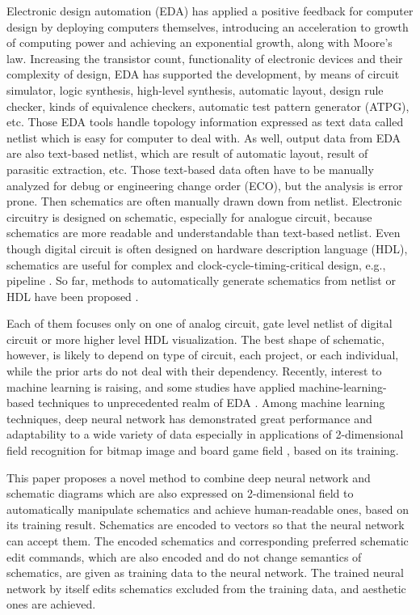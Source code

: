 \documentclass[twocolumn]{article}
\begin{document}
Electronic design automation (EDA) has applied a positive feedback
for computer design by deploying computers themselves,
introducing an acceleration to growth of computing power
and achieving an exponential growth, along with Moore's law.
Increasing the transistor count,
functionality of electronic devices and their complexity of design,
EDA has supported the development, by means of circuit simulator,
logic synthesis, high-level synthesis, automatic layout,
design rule checker, kinds of equivalence checkers,
automatic test pattern generator (ATPG), etc.
Those EDA tools handle topology information expressed as text data
called netlist which is easy for computer to deal with.
As well, output data from EDA are also text-based netlist,
which are result of automatic layout, result of parasitic extraction, etc.
Those text-based data often have to be manually analyzed
for debug or engineering change order (ECO),
but the analysis is error prone.
Then schematics are often manually drawn down from netlist.
Electronic circuitry is designed on schematic,
especially for analogue circuit,
because schematics are more readable and understandable
than text-based netlist.
Even though digital circuit is often designed
on hardware description language (HDL),
schematics are useful for complex and clock-cycle-timing-critical design,
e.g., pipeline \cite{ph}.
So far, methods to automatically generate schematics from netlist or HDL
have been proposed
\cite{nauts, anshul, fiduccia, chun, green, tsung, bogdan}.

Each of them focuses only on one of analog circuit,
gate level netlist of digital circuit
or more higher level HDL visualization.
The best shape of schematic, however, is likely to depend on
type of circuit, each project, or each individual,
while the prior arts do not deal with their dependency.
Recently, interest to machine learning is raising,
and some studies have applied machine-learning-based techniques
to unprecedented realm of EDA \cite{fan, sourav}.
Among machine learning techniques,
deep neural network has demonstrated great performance
and adaptability to a wide variety of data
especially in applications of 2-dimensional field recognition
for bitmap image \cite{nips} and board game field \cite{alphago},
based on its training.

This paper proposes a novel method to combine deep neural network and
schematic diagrams which are also expressed on 2-dimensional field
to automatically manipulate schematics
and achieve human-readable ones, based on its training result.
Schematics are encoded to vectors so that the neural network can accept them.
The encoded schematics and corresponding preferred schematic edit commands,
which are also encoded and do not change semantics of schematics,
are given as training data to the neural network.
The trained neural network by itself edits schematics excluded
from the training data, and aesthetic ones are achieved.
\end{document}
